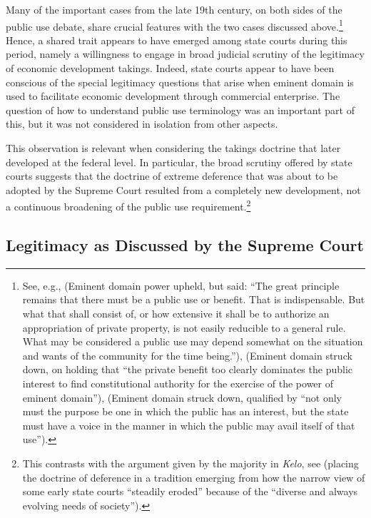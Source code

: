 {Many of the important cases from the late 19th century, on both sides of the public use debate, share crucial features with the two cases discussed above.\footnote{See, e.g., \cite{scudder32} (Eminent domain power upheld, but said: ``The great principle remains that there must be a public use or benefit. That is indispensable. But what that shall consist of, or how extensive it shall be to authorize an appropriation of private property, is not easily reducible to a general rule. What may be considered a public use may depend somewhat on the situation and wants of the community for the time being.''), \cite{fallsburg03} (Eminent domain struck down, on holding that ``the private benefit too clearly dominates the public interest to find constitutional authority for the exercise of the power of eminent domain''), \cite[538]{board91} (Eminent domain struck down, qualified by ``not only must the purpose be one in which the public has an interest, but the state must have a voice in the manner in which the public may avail itself of that use'').} Hence, a shared trait appears to have emerged among state courts during this period, namely a willingness to engage in broad judicial scrutiny of the legitimacy of economic development takings. Indeed, state courts appear to have been conscious of the special legitimacy questions that arise when eminent domain is used to facilitate economic development through commercial enterprise. The question of how to understand public use terminology was an important part of this, but it was not considered in isolation from other aspects.

This observation is relevant when considering the takings doctrine that later developed at the federal level. In particular, the broad scrutiny offered by state courts suggests that the doctrine of extreme deference that was about to be adopted by the Supreme Court resulted from a completely new development, not a continuous broadening of the public use requirement.\footnote{This contrasts with the argument given by the majority in {\it Kelo}, see \cite[479-480]{kelo05} (placing the doctrine of deference in a tradition emerging from how the narrow view of some early state courts ``steadily eroded'' because of the ``diverse and always evolving needs of society'').} 
}

\subsection{Legitimacy as Discussed by the Supreme Court}\label{subsec:US}

